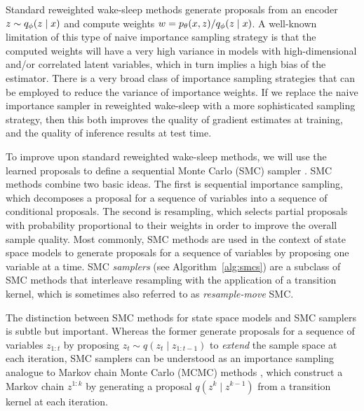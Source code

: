 \documentclass{article}
\theoremstyle{definition}
\begin{document}
Standard reweighted wake-sleep methods generate proposals from an encoder $z \sim q_\phi(z \mid x)$ and compute weights $w = p_\theta(x, z) / q_\phi(z \mid x)$. A well-known limitation of this type of naive importance sampling strategy is that the computed weights will have a very high variance in models with high-dimensional and/or correlated latent variables, which in turn implies a high bias of the estimator. There is a very broad class of importance sampling strategies that can be employed to reduce the variance of importance weights. If we replace the naive importance sampler in reweighted wake-sleep with a more sophisticated sampling strategy, then this both improves the quality of gradient estimates at training, and the quality of inference results at test time.

To improve upon standard reweighted wake-sleep methods, we will use the learned proposals to define a sequential Monte Carlo (SMC) sampler \cite{delmoral2006sequential}. %
SMC methods \cite{doucet2001sequential} combine two basic ideas. The first is sequential importance sampling, which decomposes a proposal for a sequence of variables into a sequence of conditional proposals. The second is resampling, which selects partial proposals with probability proportional to their weights in order to improve the overall sample quality. Most commonly, SMC methods are used in the context of state space models to generate proposals for a sequence of variables by proposing one variable at a time. SMC \emph{samplers} (see  Algorithm~\ref{alg:smcs}) are a subclass of SMC methods that interleave resampling with the application of a transition kernel, which is sometimes also referred to as \emph{resample-move} SMC. 

The distinction between SMC methods for state space models and SMC samplers is subtle but important. Whereas the former generate proposals for a sequence of variables $z_{1:t}$ by proposing $z_t \sim q(z_t \mid z_{1:t-1})$ to \emph{extend} the sample space at each iteration, SMC samplers can be understood as an importance sampling analogue to Markov chain Monte Carlo (MCMC) methods \cite{brooks2011handbook}, which construct a Markov chain $z^{1:k}$ by generating a proposal $q(z^k \mid z^{k-1})$ from a transition kernel at each iteration.
\end{document}
